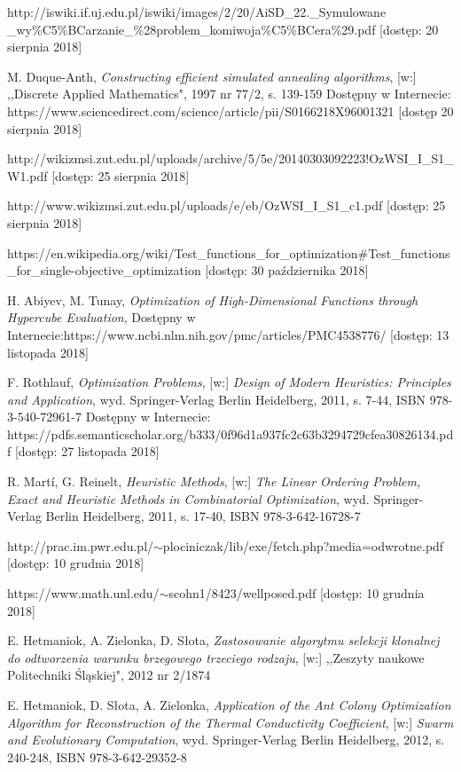 \documentclass[twoside]{projektInzynierskiMS1}
\begin{document}
\begin{thebibliography}{12}

 http://iswiki.if.uj.edu.pl/iswiki/images/2/20/AiSD\_22.\_Symulowane \_wy\%C5\%BCarzanie\_\%28problem\_komiwoja\%C5\%BCera\%29.pdf [dostęp: 20 sierpnia 2018]

 M. Duque-Anth, \textit{Constructing efficient simulated annealing algorithms}, [w:] ,,Discrete Applied Mathematics", 1997 nr 77/2, s. 139-159 Dostępny w Internecie: https://www.sciencedirect.com/science/article/pii/S0166218X96001321
[dostęp 20 sierpnia 2018]

 http://wikizmsi.zut.edu.pl/uploads/archive/5/5e/20140303092223!OzWSI\_I\_S1\_W1.pdf
[dostęp: 25 sierpnia 2018]

 http://www.wikizmsi.zut.edu.pl/uploads/e/eb/OzWSI\_I\_S1\_c1.pdf
[dostęp: 25 sierpnia 2018]

 https://en.wikipedia.org/wiki/Test\_functions\_for\_optimization\#Test\_functions\_for\_single-objective\_optimization [dostęp: 30 października 2018]

 H. Abiyev, M. Tunay, \textit{Optimization of High-Dimensional Functions through Hypercube Evaluation}, Dostępny w Internecie:https://www.ncbi.nlm.nih.gov/pmc/articles/PMC4538776/
[dostęp: 13 listopada 2018]


 F. Rothlauf, \textit{Optimization Problems}, [w:] \textit{Design of Modern Heuristics: Principles and Application}, wyd. Springer-Verlag Berlin Heidelberg, 2011, s. 7-44, ISBN 978-3-540-72961-7
Dostępny w Internecie: https://pdfs.semanticscholar.org/b333/0f96d1a937fc2c63b3294729cfea30826134.pdf
[dostęp: 27 listopada 2018]

 R. Martí, G. Reinelt, \textit{Heuristic Methods}, [w:] \textit{The Linear Ordering Problem, Exact and Heuristic Methods in Combinatorial Optimization}, wyd. Springer-Verlag Berlin Heidelberg, 2011, s. 17-40, ISBN 978-3-642-16728-7

 http://prac.im.pwr.edu.pl/$\sim$plociniczak/lib/exe/fetch.php?media=odwrotne.pdf
[dostęp: 10 grudnia 2018]

 https://www.math.unl.edu/$\sim$scohn1/8423/wellposed.pdf
 [dostęp: 10 grudnia 2018]

E. Hetmaniok, A. Zielonka, D. Słota, \textit{Zastosowanie algorytmu selekcji klonalnej do odtworzenia warunku brzegowego trzeciego rodzaju}, [w:] ,,Zeszyty naukowe Politechniki Śląskiej", 2012 nr 2/1874

 E. Hetmaniok, D. Słota, A. Zielonka, \textit{Application of the Ant Colony Optimization Algorithm for Reconstruction of the Thermal Conductivity Coefficient}, [w:] \textit{Swarm and Evolutionary Computation}, wyd. Springer-Verlag Berlin Heidelberg,  2012,  s. 240-248, ISBN 978-3-642-29352-8


\end{thebibliography}
\end{document}

